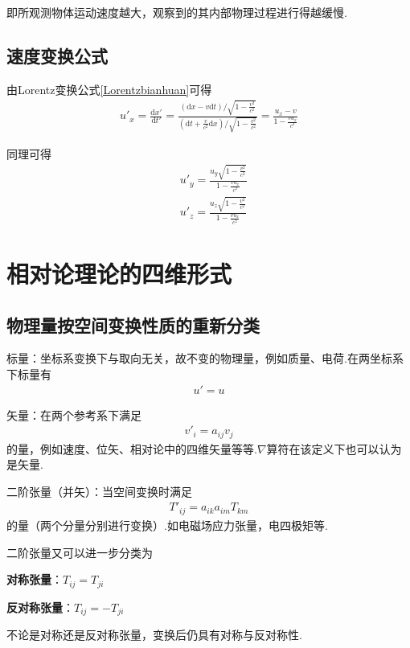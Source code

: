 \documentclass[main.tex]{subfiles}
\begin{document}
即所观测物体运动速度越大，观察到的其内部物理过程进行得越缓慢.

\subsection{速度变换公式}
由Lorentz变换公式\ref{Lorentzbianhuan}可得
\begin{align}
    u'_x = \frac{\mathrm{d}x'}{\mathrm{d}t'} = \frac{\displaystyle (\mathrm{d}x - v\mathrm{d}t)/\sqrt{1 - \frac{v^2}{c^2}}}{\displaystyle (\mathrm{d}t +\frac{v}{c^2}\mathrm{d}x)/\sqrt{1-\frac{v^2}{c^2}}} = \frac{\displaystyle u_x -v}{\displaystyle 1-\frac{vu_x}{c^2}}
\end{align}

同理可得
\begin{align}
    &u'_y = \frac{\displaystyle u_y\sqrt{1-\frac{v^2}{c^2}}}{\displaystyle 1-\frac{vu_x}{c^2}}\\
    &u'_z = \frac{\displaystyle u_z\sqrt{1-\frac{v^2}{c^2}}}{\displaystyle 1-\frac{vu_x}{c^2}}
\end{align}

\section{相对论理论的四维形式}
\subsection{物理量按空间变换性质的重新分类}
标量：坐标系变换下与取向无关，故不变的物理量，例如质量、电荷.在两坐标系下标量有
\begin{align}
    u' = u
\end{align}

矢量：在两个参考系下满足
\begin{align}
    v'_i = a_{ij}v_j
\end{align}
的量，例如速度、位矢、相对论中的四维矢量等等.$\nabla $算符在该定义下也可以认为是矢量.

二阶张量（并矢）：当空间变换时满足
\begin{align}
    T'_{ij} = a_{ik}a_{im}T_{km}
\end{align}
的量（两个分量分别进行变换）.如电磁场应力张量，电四极矩等.

二阶张量又可以进一步分类为

\textbf{对称张量}：$T_{ij} = T_{ji}$

\textbf{反对称张量}：$T_{ij} = -T_{ji}$

不论是对称还是反对称张量，变换后仍具有对称与反对称性.
\end{document}

